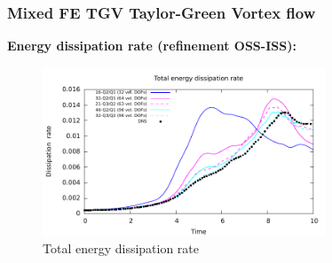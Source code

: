 \begin{frame}
 \frametitle{Mixed FE TGV {\small Taylor-Green Vortex flow}}
 \textbf{Energy dissipation rate (refinement OSS-ISS):}
 \vspace*{-0.1cm}
   \begin{figure}
     \centering	
     \includegraphics[width=0.75\textwidth]{Figures/TGV_OSS_ISS_refinement_tot.pdf}
     \vspace*{-0.3cm}
     \caption{Total energy dissipation rate}
   \end{figure}
 \begin{overlayarea}{\textwidth}{1.5cm}
  \end{overlayarea}
\end{frame}
\addtocounter{framenumber}{-1}
